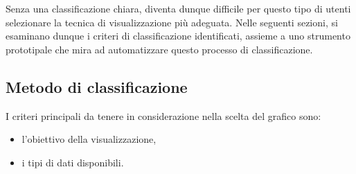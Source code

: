Senza una classificazione chiara, diventa dunque difficile per questo tipo di utenti selezionare la tecnica di visualizzazione più adeguata.
Nelle seguenti sezioni, si esaminano dunque i criteri di classificazione identificati, assieme a uno strumento prototipale che mira ad 
automatizzare questo processo di classificazione.


\subsection{Metodo di classificazione}
I criteri principali da tenere in considerazione nella scelta del grafico sono:
\begin{itemize}
    \item l'obiettivo della visualizzazione,
    \item i tipi di dati disponibili.
\end{itemize}

